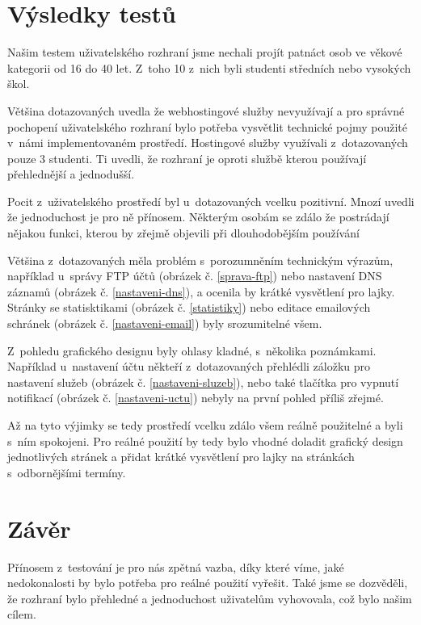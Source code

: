 \documentclass[11pt,a4paper]{article}
\begin{document}
  \section{Výsledky testů}

    Našim testem uživatelského rozhraní jsme nechali projít patnáct osob ve
    věkové kategorii od 16 do 40 let. Z~toho 10 z~nich byli studenti středních
    nebo vysokých škol.

    Většina dotazovaných uvedla že webhostingové služby nevyužívají a pro
    správné pochopení uživatelského rozhraní bylo potřeba vysvětlit technické
    pojmy použité v~námi implementovaném prostředí.
    Hostingové služby využívali z~dotazovaných pouze 3 studenti. Ti uvedli, že
    rozhraní je oproti službě kterou používají přehlednější a jednodušší.

    Pocit z~uživatelského prostředí byl u~dotazovaných vcelku pozitivní.
    Mnozí uvedli že jednoduchost je pro ně přínosem. Některým osobám se zdálo
    že postrádají nějakou funkci, kterou by zřejmě objevili při dlouhodobějším
    používání

    Většina z~dotazovaných měla problém s~porozumněním technickým výrazům,
    například u~správy FTP účtů (obrázek č. \ref{sprava-ftp}) nebo nastavení
    DNS záznamů (obrázek č. \ref{nastaveni-dns}), a ocenila by krátké
    vysvětlení pro lajky. Stránky se statisktikami
    (obrázek č. \ref{statistiky}) nebo editace emailových schránek
    (obrázek č. \ref{nastaveni-email}) byly srozumitelné všem.

    Z~pohledu grafického designu byly ohlasy kladné, s~několika poznámkami.
    Například u~nastavení účtu někteří z~dotazovaných přehlédli záložku
    pro nastavení služeb (obrázek č. \ref{nastaveni-sluzeb}), nebo také
    tlačítka pro vypnutí notifikací (obrázek č. \ref{nastaveni-uctu}) nebyly
    na první pohled příliš zřejmé.

    Až na tyto výjimky se tedy prostředí vcelku zdálo všem reálně použitelné a
    byli s~ním spokojeni. Pro reálné použití by tedy bylo vhodné doladit
    grafický design jednotlivých stránek a přidat krátké vysvětlení pro lajky
    na stránkách s~odbornějšími termíny.

  \section{Závěr}

    Přínosem z~testování je pro nás zpětná vazba, díky které víme, jaké
    nedokonalosti by bylo potřeba pro reálné použití vyřešit. Také jsme se
    dozvěděli, že rozhraní bylo přehledné a jednoduchost uživatelům vyhovovala,
    což bylo našim cílem.
\end{document}
